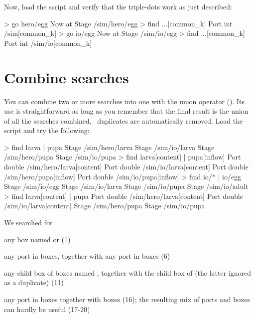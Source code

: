  Now,  load the  script and verify that the triple-dots work as just described:
 
\lstset{numbers=left}
\begin{usdialog}
> go hero/egg
Now at Stage /sim/hero/egg
> find ...[common_k]
Port int /sim[common_k]
> go io/egg
Now at Stage /sim/io/egg
> find ...[common_k]
Port int /sim/io[common_k]
\end{usdialog}
\lstset{numbers=none}

\section{Combine searches}
You can combine two or more searches into one with the union operator (\code{|}). Its use is straightforward as long as you remember that the final result is the union of all the searches combined, \ie\ duplicates are automatically removed.  Load the  script and try the following:

\lstset{numbers=left}
\begin{usdialog}
> find larva | pupa
Stage /sim/hero/larva
Stage /sim/io/larva
Stage /sim/hero/pupa
Stage /sim/io/pupa
> find larva[content] | pupa[inflow]
Port double /sim/hero/larva[content]
Port double /sim/io/larva[content]
Port double /sim/hero/pupa[inflow]
Port double /sim/io/pupa[inflow]
> find io/* | io/egg
Stage /sim/io/egg
Stage /sim/io/larva
Stage /sim/io/pupa
Stage /sim/io/adult
> find larva[content] | pupa
Port double /sim/hero/larva[content]
Port double /sim/io/larva[content]
Stage       /sim/hero/pupa
Stage       /sim/io/pupa
\end{usdialog}
\lstset{numbers=none}

\noindent
We searched for 
\begin{compactitem}
\item any box named  or  (1)
\item any  port in  boxes, together with any  port in  boxes (6)
\item any child box of boxes named , together with the  child box of   (the latter ignored as a duplicate) (11)
\item any  port in  boxes together with  boxes (16); the resulting mix of ports and boxes can hardly be useful (17-20)
\end{compactitem}

